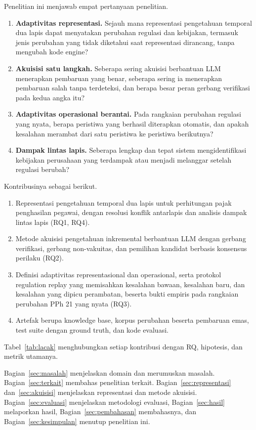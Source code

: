 \documentclass[journal,a4paper]{IEEEtran}
\makeatletter
\DeclareRobustCommand{\en}[1]{{\usefont{\f@encoding}{\f@family}{\f@series}{it}#1\/}}
\makeatother
\begin{document}
Penelitian ini menjawab empat pertanyaan penelitian.
\begin{enumerate}[label=\textbf{RQ\arabic*},leftmargin=*,nosep]
  \item \textbf{Adaptivitas representasi.} Sejauh mana representasi pengetahuan temporal dua lapis dapat menyatakan perubahan regulasi dan kebijakan, termasuk jenis perubahan yang tidak diketahui saat representasi dirancang, tanpa mengubah kode \en{engine}?
  \item \textbf{Akuisisi satu langkah.} Seberapa sering akuisisi berbantuan LLM menerapkan pembaruan yang benar, seberapa sering ia menerapkan pembaruan salah tanpa terdeteksi, dan berapa besar peran gerbang verifikasi pada kedua angka itu?
  \item \textbf{Adaptivitas operasional berantai.} Pada rangkaian perubahan regulasi yang nyata, berapa peristiwa yang berhasil diterapkan otomatis, dan apakah kesalahan merambat dari satu peristiwa ke peristiwa berikutnya?
  \item \textbf{Dampak lintas lapis.} Seberapa lengkap dan tepat sistem mengidentifikasi kebijakan perusahaan yang terdampak atau menjadi melanggar setelah regulasi berubah?
\end{enumerate}

Kontribusinya sebagai berikut.
\begin{enumerate}[label=\textbf{K\arabic*},leftmargin=*,nosep]
  \item Representasi pengetahuan temporal dua lapis untuk perhitungan pajak penghasilan pegawai, dengan resolusi konflik antarlapis dan analisis dampak lintas lapis (RQ1, RQ4).
  \item Metode akuisisi pengetahuan inkremental berbantuan LLM dengan gerbang verifikasi, gerbang non-vakuitas, dan pemilihan kandidat berbasis konsensus perilaku (RQ2).
  \item Definisi adaptivitas representasional dan operasional, serta protokol \en{regulation replay} yang memisahkan kesalahan bawaan, kesalahan baru, dan kesalahan yang dipicu perambatan, beserta bukti empiris pada rangkaian perubahan PPh 21 yang nyata (RQ3).
  \item Artefak berupa \en{knowledge base}, korpus perubahan beserta pembaruan emas, \en{test suite} dengan \en{ground truth}, dan kode evaluasi.
\end{enumerate}
Tabel~\ref{tab:lacak} menghubungkan setiap kontribusi dengan RQ, hipotesis, dan metrik utamanya.

Bagian~\ref{sec:masalah} menjelaskan domain dan merumuskan masalah. Bagian~\ref{sec:terkait} membahas penelitian terkait. Bagian~\ref{sec:representasi} dan~\ref{sec:akuisisi} menjelaskan representasi dan metode akuisisi. Bagian~\ref{sec:evaluasi} menjelaskan metodologi evaluasi, Bagian~\ref{sec:hasil} melaporkan hasil, Bagian~\ref{sec:pembahasan} membahasnya, dan Bagian~\ref{sec:kesimpulan} menutup penelitian ini.
\end{document}
